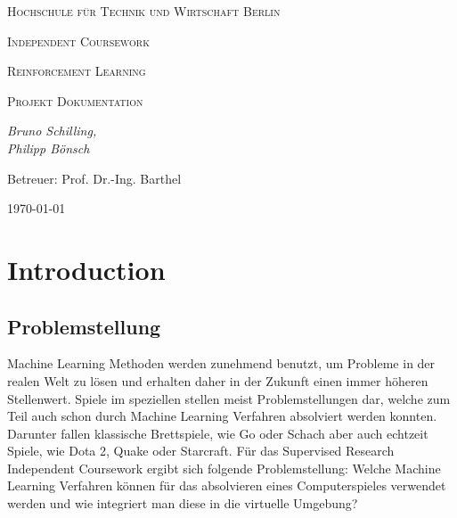 \documentclass[11pt]{scrartcl}
\begin{document}

\begin{titlepage}
	\centering
	{\scshape\LARGE Hochschule für Technik und Wirtschaft Berlin \par}
	\vspace{2cm}
	{\Huge \scshape{Independent Coursework}\par}
	\vspace{2cm}
	{\LARGE \scshape{Reinforcement Learning}\par}
	{\scshape\Large Projekt Dokumentation\par}
	\vspace{4cm}
	{\large\itshape Bruno Schilling,\\Philipp Bönsch\par}
	\vfill
	
	{\large Betreuer: Prof. Dr.-Ing. Barthel \par}
	\vspace{1cm}
	{\large \today\par}
\end{titlepage}

\lstset{basicstyle=\ttfamily\small,breaklines=true}
\newpage
\tableofcontents
\newpage
\section{Introduction}

\subsection{Problemstellung}
Machine Learning Methoden werden zunehmend benutzt, um Probleme in der realen Welt zu
lösen und erhalten daher in der Zukunft einen immer höheren Stellenwert. Spiele im
speziellen stellen meist Problemstellungen dar, welche zum Teil auch schon durch Machine
Learning Verfahren absolviert werden konnten. Darunter fallen klassische Brettspiele, wie Go
oder Schach\cite{DM2018} aber auch echtzeit Spiele, wie Dota 2\cite{OA2019},
Quake\cite{DM2019} oder Starcraft\cite{DM2019_2}. Für das Supervised Research Independent Coursework
ergibt sich folgende Problemstellung: Welche Machine Learning Verfahren können für das
absolvieren eines Computerspieles verwendet werden und wie integriert man diese in die
virtuelle Umgebung?
\end{document}
